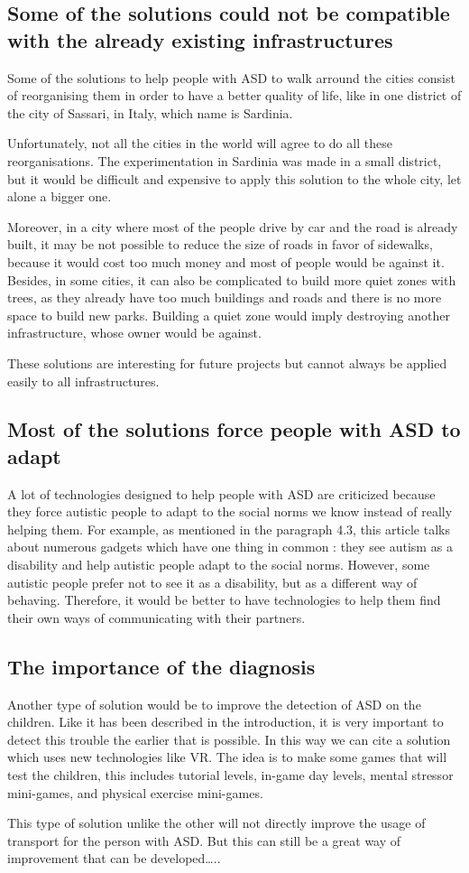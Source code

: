 \subsection{Some of the solutions could not be compatible with the already existing infrastructures}
Some of the solutions to help people with ASD to walk arround the cities consist of reorganising them in order to have a better quality of life, like in one district of the city of Sassari, in Italy, which name is Sardinia.\cite{2018MobilityPoliciesExtraSmall}

Unfortunately, not all the cities in the world will agree to do all these reorganisations. The experimentation in Sardinia was made in a small district, but it would be difficult and expensive to apply this solution to the whole city, let alone a bigger one.

Moreover, in a city where most of the people drive by car and the road is already built, it may be not possible to reduce the size of roads in favor of sidewalks, because it would cost too much money and most of people would be against it. Besides, in some cities, it can also be complicated to build more quiet zones with trees, as they already have too much buildings and roads and there is no more space to build new parks. Building a quiet zone would imply destroying another infrastructure, whose owner would be against. 

These solutions are interesting for future projects but cannot always be applied easily to all infrastructures.

\subsection{Most of the solutions force people with ASD to adapt}
A lot of technologies designed to help people with ASD are criticized because they force autistic people to adapt to the social norms we know instead of really helping them. For example, as mentioned in the paragraph 4.3, this article talks about numerous gadgets which have one thing in common : they see autism as a disability and help autistic people adapt to the social norms.\cite{2017UTravelSmartMobility} However, some autistic people prefer not to see it as a disability, but as a different way of behaving. Therefore, it would be better to have technologies to help them find their own ways of communicating with their partners. 

\subsection{The importance of the diagnosis}
Another type of solution would be to improve the detection of ASD on the children. Like it has been described in the introduction, it is very important to detect this trouble the earlier that is possible. In this way we can cite a solution which uses new technologies like VR. The idea is to make some games that will test the children, this includes tutorial levels, in-game day levels, mental stressor mini-games, and physical exercise mini-games. \cite{2021DesigningSmartVirtual}

This type of solution unlike the other will not directly improve the usage of transport for the person with ASD. But this can still be a great way of improvement that can be developed….. 
